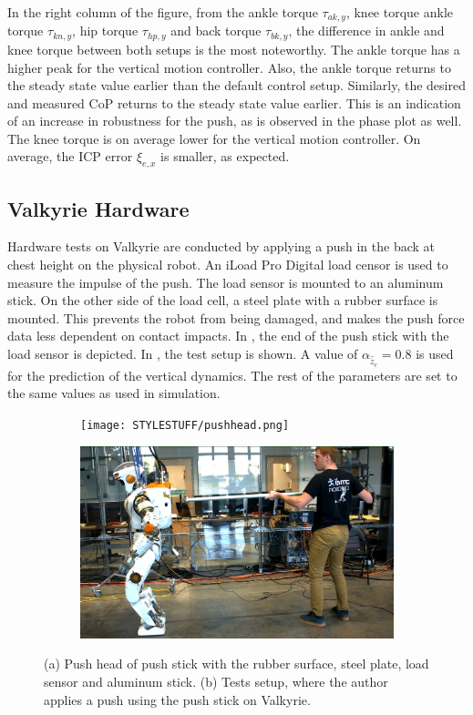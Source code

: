In the right column of the figure, from the ankle torque $\tau_{ak,y}$, knee torque ankle torque $\tau_{kn,y}$, hip torque $\tau_{hp,y}$ and back torque $\tau_{bk,y}$, the difference in ankle and knee torque between both setups is the most noteworthy. The ankle torque has a higher peak for the vertical motion controller. Also, the ankle torque returns to the steady state value earlier than the default control setup. Similarly, the desired and measured \ac{CoP} returns to the steady state value earlier. This is an indication of an increase in robustness for the push, as is observed in the phase plot as well. The knee torque is on average lower for the vertical motion controller. On average, the \ac{ICP} error $\xi_{e,x}$ is smaller, as expected.

\subsection{Valkyrie Hardware} 
Hardware tests on Valkyrie are conducted by applying a push in the back at chest height on the physical robot. An iLoad Pro Digital load censor \cite{iload} is used to measure the impulse of the push. The load sensor is mounted to an aluminum stick. On the other side of the load cell, a steel plate with a rubber surface is mounted. This prevents the robot from being damaged, and makes the push force data less dependent on contact impacts. In , the end of the push stick with the load sensor is depicted. In , the test setup is shown. A value of $\alpha_{\hat{\ddot{z}}_{c}}=0.8$ is used for the prediction of the vertical dynamics. The rest of the parameters are set to the same values as used in simulation.
\begin{figure}
\centering
  \begin{subfigure}{0.495\textwidth}
  \centering
  \texttt{[image: STYLESTUFF/pushhead.png]}
   \caption{}
    \label{fig:pushhead}
  \end{subfigure}
  \begin{subfigure}{0.495\textwidth}
    \centering
  \includegraphics[width=.94\linewidth]{STYLESTUFF/authorpush.png}
  \caption{}
   \label{fig:authorpush}
  \end{subfigure}
  \caption{(a) Push head of push stick with the rubber surface, steel plate, load sensor and aluminum stick. (b) Tests setup, where the author applies a push using the push stick on Valkyrie.}
  \label{fig:pushsetup}
\end{figure}

